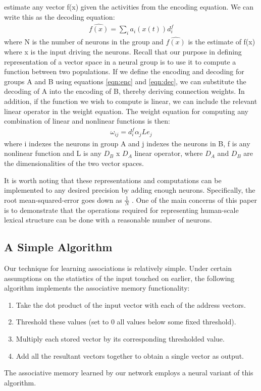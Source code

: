 \documentclass[10pt,letterpaper]{article}
\begin{document}
estimate any vector f(x) given the activities from the encoding equation. We can write
this as the decoding equation:
\begin{align}
\widehat{f(x)} = \sum_i a_i(x(t)) d^f_i \label{eqn:dec}
\end{align}
where N is the number of neurons in the group and $\widehat{f(x)}$ is the estimate of f(x) where x is the input driving the neurons. Recall that our purpose in defining representation of a vector space in a neural group
is to use it to compute a function between two populations. If we define the encoding
and decoding for groups A and B using equations \eqref{eqn:enc} and \eqref{eqn:dec}, we can substitute the
decoding of A into the encoding of B, thereby deriving connection weights. In addition, if the function we wish to compute is linear, we can include the relevant
linear operator in the weight equation. The weight equation for computing
any combination of linear and nonlinear functions is then:
\begin{align}
\omega_{ij} = d^f_i \alpha_j L e_j\label{eqn:weight}
\end{align}
where i indexes the neurons in group A and j indexes the neurons in B, f is any nonlinear function and L is any $D_B$ x $D_A$ linear operator, where $D_A$ and $D_B$ are the dimensionalities of the two vector spaces.

It is worth noting that these representations and computations can be implemented to any desired precision by adding enough neurons. Specifically, the root mean-squared-error goes down as $\frac{1}{N}$ \citep{Eliasmith2003m}. One of the main concerns of this paper is to demonstrate that the operations required for representing human-scale lexical structure can be done with a reasonable number of neurons.

\subsection{A Simple Algorithm}
Our technique for learning associations is relatively simple. Under certain assumptions on the statistics of the input touched on earlier, the following algorithm implements the associative memory functionality:
\begin{enumerate}
\item Take the dot product of the input vector with each of the address vectors.
\item Threshold these values (set to 0 all values below some fixed threshold).
\item Multiply each stored vector by its corresponding thresholded value.
\item Add all the resultant vectors together to obtain a single vector as output.
\end{enumerate}
The associative memory learned by our network employs a neural variant of this algorithm. 
\end{document}
